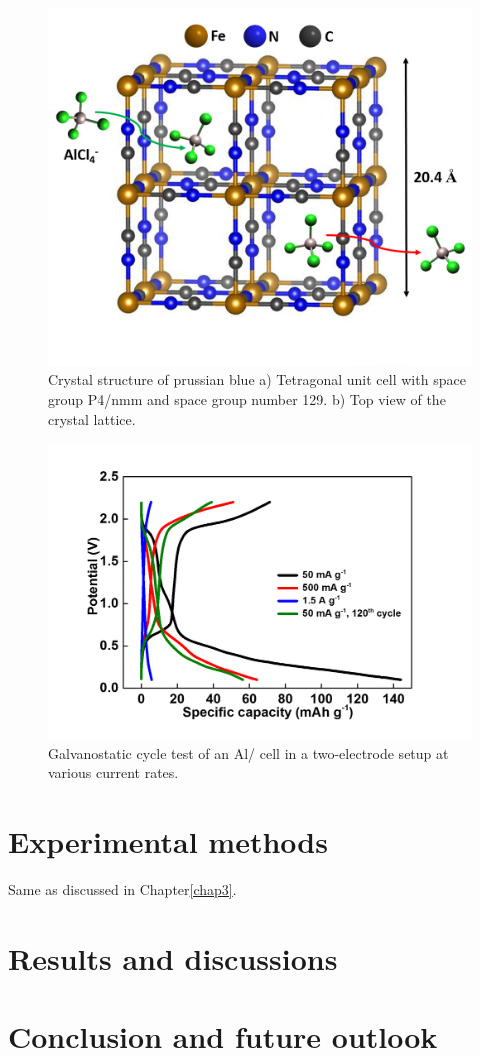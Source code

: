  \begin{figure}[tbh!]
  \centering
  \includegraphics[width=\textwidth]{Figures/chap6fig/pbcrys}
    \caption{Crystal structure of prussian blue a) Tetragonal unit cell with space group P4/nmm and space group number 129. b) Top view of the crystal lattice.}
  \label{Figures/chap6fig:pbcrys}
\end{figure}
 \begin{figure}[tbh!]
  \centering
  \includegraphics[width=\textwidth]{Figures/chap6fig/pbCDC}
    \caption{Galvanostatic cycle test of an Al/ cell in a two-electrode setup at various current rates.}
  \label{Figures/chap6fig:pbCDC}
\end{figure}





\section{Experimental methods}
Same as discussed in Chapter\ref{chap3}.
\section{Results and discussions}
\subsection*{}






\section{Conclusion and future outlook}